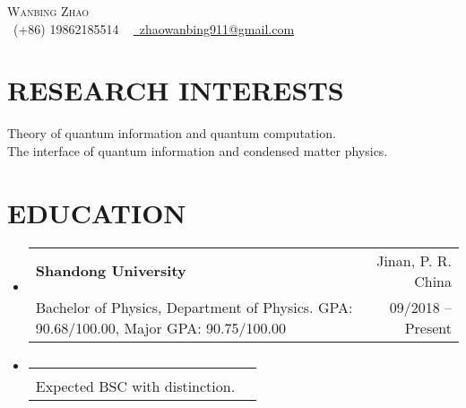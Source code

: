 \documentclass[letterpaper,11pt]{article}
\makeatletter
\newcommand{\resumeSubheading}[4]{
  \item
    \begin{tabular*}{1.0\textwidth}[t]{l@{\extracolsep{\fill}}r}
      \textbf{#1} & {\small #2} \\
      {\small#3} & {\small #4} \\
    \end{tabular*}
}
\newcommand{\resumeSubHeadingListStart}{\begin{itemize}[leftmargin=0.0in, label={}]}
\newcommand{\resumeSubHeadingListEnd}{\end{itemize}}
\makeatother
\begin{document}

\begin{center}
    {\Huge \scshape Wanbing Zhao} \\ \vspace{2pt}
    \small \raisebox{-0.1\height}\faPhone\ (+86) 19862185514 ~ \href{mailto:x@gmail.com}{\raisebox{-0.2\height}\faEnvelope\  \underline{zhaowanbing911@gmail.com}} ~ 
    \vspace{0.6cm}
\end{center}


\section{RESEARCH INTERESTS}

     {Theory of quantum information and quantum computation.} \\
     {The interface of quantum information and condensed matter physics.} 






\section{EDUCATION}
  \resumeSubHeadingListStart
    \resumeSubheading
      {Shandong University}{Jinan, P. R. China}
      {Bachelor of Physics, Department of Physics. GPA: 90.68/100.00, Major GPA: 90.75/100.00}{09/2018 – Present}
  \resumeSubHeadingListEnd
  \vspace{-1.5cm}
    \resumeSubHeadingListStart
    \resumeSubheading
{}{}{Expected BSC with distinction.}{}
  \resumeSubHeadingListEnd
  
\end{document}
